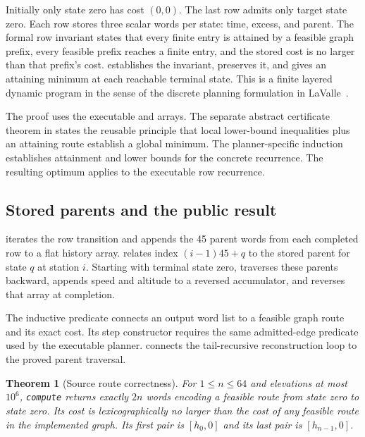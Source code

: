 \documentclass[11pt]{article}
\newtheorem{theorem}{Theorem}
\begin{document}
Initially only state zero has cost $(0,0)$.  The last row admits only target state zero.  Each row stores three scalar words per state: time, excess, and parent.  The formal row invariant states that every finite entry is attained by a feasible graph prefix, every feasible prefix reaches a finite entry, and the stored cost is no larger than that prefix's cost.   establishes the invariant,  preserves it, and  gives an attaining minimum at each reachable terminal state.  This is a finite layered dynamic program in the sense of the discrete planning formulation in LaValle~\cite{lavalle}.

The proof uses the executable  and  arrays.  The separate abstract certificate theorem in  states the reusable principle that local lower-bound inequalities plus an attaining route establish a global minimum.  The planner-specific induction establishes attainment and lower bounds for the concrete recurrence.  The resulting optimum applies to the executable row recurrence.

\subsection{Stored parents and the public result}

 iterates the row transition and appends the 45 parent words from each completed row to a flat history array.   relates index $(i-1)45+q$ to the stored parent for state $q$ at station $i$.  Starting with terminal state zero,  traverses these parents backward, appends speed and altitude to a reversed accumulator, and reverses that array at completion.

The inductive predicate  connects an output word list to a feasible graph route and its exact cost.  Its step constructor requires the same admitted-edge predicate used by the executable planner.   connects the tail-recursive reconstruction loop to the proved parent traversal.

\begin{theorem}[Source route correctness]
For $1\leq n\leq64$ and elevations at most $10^6$, \textup{\texttt{compute}} returns exactly $2n$ words encoding a feasible route from state zero to state zero.  Its cost is lexicographically no larger than the cost of any feasible route in the implemented graph.  Its first pair is $[h_0,0]$ and its last pair is $[h_{n-1},0]$.
\end{theorem}
\end{document}
